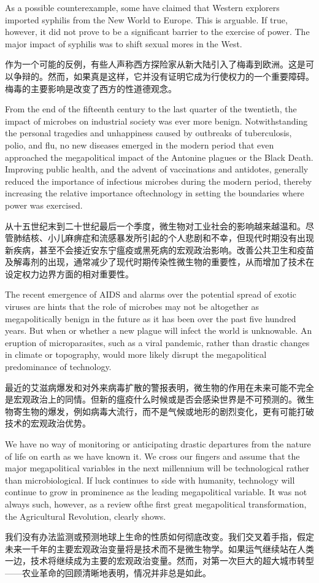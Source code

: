 \begin{paracol}{2}
\switchcolumn*
As a possible counterexample, some have claimed that Western explorers imported syphilis from the New World to Europe. This is arguable. If true, however, it did not prove to be a significant barrier to the exercise of power. The major impact of syphilis was to shift sexual mores in the West.

\switchcolumn
作为一个可能的反例，有些人声称西方探险家从新大陆引入了梅毒到欧洲。这是可以争辩的。然而，如果真是这样，它并没有证明它成为行使权力的一个重要障碍。梅毒的主要影响是改变了西方的性道德观念。

\switchcolumn*
From the end of the fifteenth century to the last quarter of the twentieth, the impact of microbes on industrial society was ever more benign. Notwithstanding the personal tragedies and unhappiness caused by outbreaks of tuberculosis, polio, and flu, no new diseases emerged in the modern period that even approached the megapolitical impact of the Antonine plagues or the Black Death. Improving public health, and the advent of vaccinations and antidotes, generally reduced the importance of infectious microbes during the modern period, thereby increasing the relative importance oftechnology in setting the boundaries where power was exercised. 

\switchcolumn
从十五世纪末到二十世纪最后一个季度，微生物对工业社会的影响越来越温和。尽管肺结核、小儿麻痹症和流感暴发所引起的个人悲剧和不幸，但现代时期没有出现新疾病，甚至不会接近安东宁瘟疫或黑死病的宏观政治影响。改善公共卫生和疫苗及解毒剂的出现，通常减少了现代时期传染性微生物的重要性，从而增加了技术在设定权力边界方面的相对重要性。

\switchcolumn*
The recent emergence of AIDS and alarms over the potential spread of exotic viruses are hints that the role of microbes may not be altogether as megapolitically benign in the future as it has been over the past five hundred years. But when or whether a new plague will infect the world is unknowable. An eruption of microparasites, such as a viral pandemic, rather than drastic changes in climate or topography, would more likely disrupt the megapolitical predominance of technology.

\switchcolumn
最近的艾滋病爆发和对外来病毒扩散的警报表明，微生物的作用在未来可能不完全是宏观政治上的同情。但新的瘟疫什么时候或是否会感染世界是不可预测的。微生物寄生物的爆发，例如病毒大流行，而不是气候或地形的剧烈变化，更有可能打破技术的宏观政治优势。

\switchcolumn*
We have no way of monitoring or anticipating drastic departures from the nature of life on earth as we have known it. We cross our fingers and assume that the major megapolitical variables in the next millennium will be technological rather than microbiological. If luck continues to side with humanity, technology will continue to grow in prominence as the leading megapolitical variable. It was not always such, however, as a review ofthe first great megapolitical transformation, the Agricultural Revolution, clearly shows.

\switchcolumn
我们没有办法监测或预测地球上生命的性质如何彻底改变。我们交叉着手指，假定未来一千年的主要宏观政治变量将是技术而不是微生物学。如果运气继续站在人类一边，技术将继续成为主要的宏观政治变量。然而，对第一次巨大的超大城市转型——农业革命的回顾清晰地表明，情况并非总是如此。

\end{paracol}
